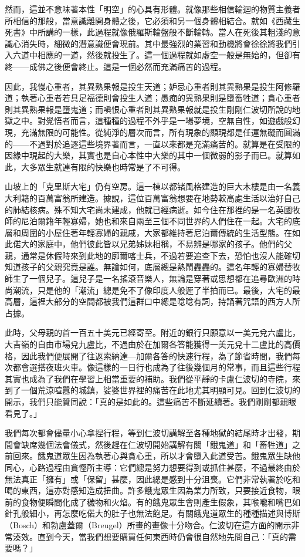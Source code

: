 然而，這並不意味著本性「明空」的心具有形體。就像那些相信輪迴的物質主義者所相信的那般，當意識離開身體之後，它必須和另一個身體相結合。就如《西藏生死書》中所講的一樣，此過程就像俄羅斯輪盤般不斷輪轉。當人在死後其粗淺的意識心消失時，細微的潛意識便會現前。其中最強烈的業習和動機將會徐徐將我們引入六道中相應的一道，然後就投生了。這一個過程就如虛空一般是無始的，但卻有終——成佛之後便會終止。這是一個必然而充滿痛苦的過程。

因此，我慢心重者，其異熟果報是投生天道；妒忌心重者則其異熟果是投生阿修羅道；執著心重者若具足福德則會投生人道；愚痴的異熟果則是墮畜牲道；貪心重者則其異熟果報是墮鬼道；而嗔恨心重者則其異熟果報就是投生剛剛仁波切所說的地獄之中。對覺悟者而言，這種種的過程不外乎是一場夢境，空無自性，如遊戲般幻現，充滿無限的可能性。從純淨的層次而言，所有現象的顯現都是任運無礙而圓滿的——不過對於追逐這些境界著而言，一直以來都是充滿痛苦的。就算是在受限的因緣中現起的大樂，其實也是自心本性中大樂的其中一個微弱的影子而已。就算如此，大多眾生就連有限的快樂也時常是了不可得。

山坡上的「克里斯大宅」仍有空房。這一棟以都锗風格建造的巨大木樓是由一名義大利籍的百萬富翁所建造。據說，這位百萬富翁想要在地勢較高處生活以治好自己的肺結核病。殊不知大宅尚未建成，他就已經病逝。如今住在那裡的是一名英國牧師的尼泊爾籍年輕寡婦，她也和來自兩至三個不同世界的人們住在一起。大宅的底層和周圍的小屋住著年輕寡婦的親戚，大家都維持著尼泊爾傳統的生活型態。在如此偌大的家庭中，他們彼此皆以兄弟姊妹相稱，不易辨是哪家的孩子。他們的父親，通常是休假時來到此地的廓爾喀士兵，不過若要追查下去，恐怕也沒人能確切知道孩子的父親究竟是誰。無論如何，底層總是熱鬧轟轟的。這名年輕的寡婦替牧師生了一個兒子。這兒子是一名搖滾音樂人，無論是穿著或思想都在追尋歐洲的時尚潮流，只是他的「潮流」總是免不了像印度人般遲了半拍而已。最後，大宅的最高層，這裡大部分的空間都被我們這群口中總是唸唸有詞，持誦著咒語的西方人所占據。

此時，父母親的首一百五十美元已經寄至。附近的銀行只願意以一美元兌六盧比，大吉嶺的自由市場兌九盧比，不過由於在加爾各答能獲得一美元兌十二盧比的高價格，因此我們便展開了往返索納達---加爾各答的快速行程，為了節省時間，我們每次都會選搭夜班火車。像這樣的一日行也成為了往後幾個月的常事，而且這些行程其實也成為了我們在學習上相當重要的補助。我們從平靜的卡盧仁波切的寺院，來到了一個荒涼喧囂的城鎮，娑婆世界裡的痛苦在此地尤其明顯可見。回到仁波切的開示，我們只能贊同說：「真的是如此的。這些痛苦不斷延續著。我們剛剛都親眼看見了。」

我們每次都會儘量小心拿捏行程，等到仁波切講解至各種地獄的結尾時才出發，期間會缺席幾個法會儀式，然後趕在仁波切開始講解有關「餓鬼道」和「畜牲道」之前回來。餓鬼道眾生因為執著心與貪心重，所以才會墮入此道受苦。餓鬼眾生缺他同心，心路過程由貪慳所主導：它們總是努力想要得到或抓住甚麼，不過最終由於無法真正「擁有」或「保留」甚麼，因此總是感到十分沮喪。它們非常執著於吃和喝的東西，這亦對感知造成扭曲。許多餓鬼眾生因為業力所致，只要接近食物，眼前的食物便瞬間化成了穢物和火焰。有的餓鬼眾生會則產生假象，其喉嚨和嘴巴如針孔般細小，再怎麼吃偌大的肚子也無法飽足。有關餓鬼道眾生的種種描述與博斯（Bosch）和勃盧蓋爾（Breugel）所畫的畫像十分吻合。仁波切在這方面的開示非常湊效。直到今天，當我們想要購買任何東西時仍會很自然地先問自己：「真的需要嗎？」

